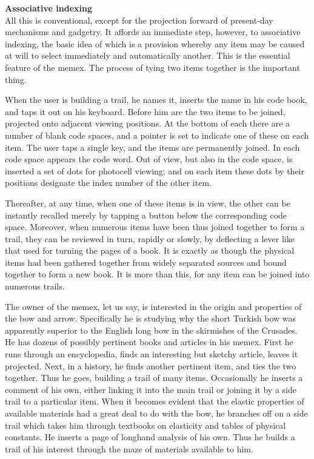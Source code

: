\documentclass[]{book}
\theoremstyle{definition}
\theoremstyle{definition}
\theoremstyle{definition}
\theoremstyle{remark}
\begin{document}
\textbf{Associative indexing}\\
All this is conventional, except for the projection forward of
present-day mechanisms and gadgetry. It affords an immediate step,
however, to associative indexing, the basic idea of which is a provision
whereby any item may be caused at will to select immediately and
automatically another. This is the essential feature of the memex. The
process of tying two items together is the important thing.

When the user is building a trail, he names it, inserts the name in his
code book, and taps it out on his keyboard. Before him are the two items
to be joined, projected onto adjacent viewing positions. At the bottom
of each there are a number of blank code spaces, and a pointer is set to
indicate one of these on each item. The user taps a single key, and the
items are permanently joined. In each code space appears the code word.
Out of view, but also in the code space, is inserted a set of dots for
photocell viewing; and on each item these dots by their positions
designate the index number of the other item.

Thereafter, at any time, when one of these items is in view, the other
can be instantly recalled merely by tapping a button below the
corresponding code space. Moreover, when numerous items have been thus
joined together to form a trail, they can be reviewed in turn, rapidly
or slowly, by deflecting a lever like that used for turning the pages of
a book. It is exactly as though the physical items had been gathered
together from widely separated sources and bound together to form a new
book. It is more than this, for any item can be joined into numerous
trails.

The owner of the memex, let us say, is interested in the origin and
properties of the bow and arrow. Specifically he is studying why the
short Turkish bow was apparently superior to the English long bow in the
skirmishes of the Crusades. He has dozens of possibly pertinent books
and articles in his memex. First he runs through an encyclopedia, finds
an interesting but sketchy article, leaves it projected. Next, in a
history, he finds another pertinent item, and ties the two together.
Thus he goes, building a trail of many items. Occasionally he inserts a
comment of his own, either linking it into the main trail or joining it
by a side trail to a particular item. When it becomes evident that the
elastic properties of available materials had a great deal to do with
the bow, he branches off on a side trail which takes him through
textbooks on elasticity and tables of physical constants. He inserts a
page of longhand analysis of his own. Thus he builds a trail of his
interest through the maze of materials available to him.
\end{document}
